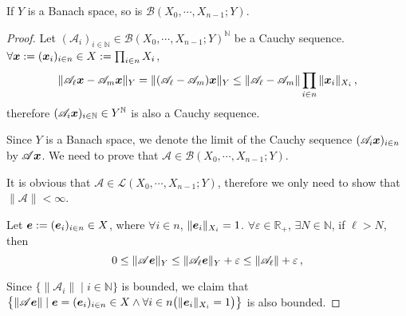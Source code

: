 \documentclass[openany]{book}
\begin{document}
\begin{theorem}[completeness]
	\label{theorem: Y is complete so is the space of linear operators onto it}
	If $Y$ is a Banach space, so is $\mathcal B(X_0, \cdots, X_{n-1}; Y)$.
\end{theorem}
\begin{proof}
	Let $(\mathscr A_i)_{i \in \mathbb N} \in \mathcal B(X_0, \cdots, X_{n-1}; Y)^{\mathbb N}$ be a Cauchy sequence. 
	$\forall \boldsymbol{x} := (\boldsymbol{x}_i)_{i \in n} \in X := \prod_{i \in n} X_i$, 
	\begin{equation*}
		\|\mathscr A_\ell \boldsymbol{x} - \mathscr A_m \boldsymbol{x}\|_Y
		= \|(\mathscr A_\ell - \mathscr A_m) \boldsymbol{x}\|_Y
		\leq \|\mathscr A_\ell - \mathscr A_m\| \prod_{i \in n} \|\boldsymbol{x}_i\|_{X_i}
		\,,
	\end{equation*}
	therefore $(\mathscr A_i \boldsymbol{x})_{i \in \mathbb N} \in Y^\mathbb N$ is also a Cauchy sequence.

	Since $Y$ is a Banach space, we denote the limit of the Cauchy sequence $(\mathscr A_i \boldsymbol{x})_{i \in n}$ by $\mathscr A \boldsymbol{x}$. 
	We need to prove that $\mathscr A \in \mathcal B(X_0, \cdots, X_{n-1}; Y)$.

	It is obvious that $\mathscr A \in \mathcal L(X_0, \cdots, X_{n-1}; Y)$, therefore we only need to show that $\|\mathscr A\| < \infty$.

	Let $\boldsymbol{e} := (\boldsymbol{e}_i)_{i \in n} \in X$, where $\forall i \in n$, $\|\boldsymbol{e}_i\|_{X_i} = 1$. 
	$\forall \varepsilon \in \mathbb R_+$, $\exists N \in \mathbb N$, if $\ell > N$, then
	\begin{equation*}
		0 \leq \|\mathscr A \boldsymbol{e}\|_Y
			\leq \|\mathscr A_\ell \boldsymbol{e}\|_Y + \varepsilon
			\leq \|\mathscr A_\ell\| + \varepsilon\,, 
	\end{equation*} 

	Since $\{\|\mathscr A_i\| \mid i \in \mathbb N\}$ is bounded, we claim that $\big\{\|\mathscr A \boldsymbol{e}\| \mid \boldsymbol{e} = (\boldsymbol{e}_i)_{i \in n} \in X \wedge \forall i \in n \big( \|\boldsymbol{e}_i\|_{X_i} = 1\big)\big\}$ is also bounded.
\end{proof}
\end{document}
